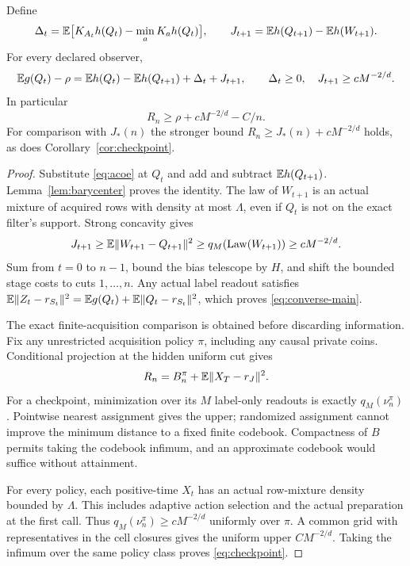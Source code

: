 \begin{proposition}\label{prop:all-observer}
Define
\[
 \Delta_t=\mathbb E\bigl[K_{A_t}h(Q_t)-\min_aK_ah(Q_t)\bigr],\qquad
 J_{t+1}=\mathbb E h(Q_{t+1})-\mathbb E h(W_{t+1}).
\]
For every declared observer,
\begin{equation}\label{eq:bellman-loss}
 \mathbb E g(Q_t)-\rho
  =\mathbb E h(Q_t)-\mathbb E h(Q_{t+1})+\Delta_t+J_{t+1},
 \qquad \Delta_t\ge0,\quad J_{t+1}\ge cM^{-2/d}.
\end{equation}
In particular
\begin{equation}\label{eq:converse-main}
 R_n\ge\rho+cM^{-2/d}-C/n.
\end{equation}
For comparison with $J_*(n)$ the stronger bound $R_n\ge J_*(n)+cM^{-2/d}$ holds, as does Corollary~\ref{cor:checkpoint}.
\end{proposition}
\begin{proof}
Substitute \eqref{eq:acoe} at $Q_t$ and add and subtract $\mathbb E h(Q_{t+1})$. Lemma~\ref{lem:barycenter} proves the identity. The law of $W_{t+1}$ is an actual mixture of acquired rows with density at most $\Lambda$, even if $Q_t$ is not on the exact filter's support. Strong concavity gives
\[
 J_{t+1}\ge\mathbb E\lVert W_{t+1}-Q_{t+1}\rVert^2
            \ge q_M(\operatorname{Law}(W_{t+1}))\ge cM^{-2/d}.
\]
Sum from $t=0$ to $n-1$, bound the bias telescope by $H$, and shift the bounded stage costs to cuts $1,\ldots,n$. Any actual label readout satisfies
$\mathbb E\lVert Z_t-r_{S_t}\rVert^2=\mathbb E g(Q_t)+\mathbb E\lVert Q_t-r_{S_t}\rVert^2$,
which proves \eqref{eq:converse-main}.

The exact finite-acquisition comparison is obtained before discarding information. Fix any unrestricted acquisition policy $\pi$, including any causal private coins. Conditional projection at the hidden uniform cut gives
\[
 R_n=B_n^\pi+\mathbb E\lVert X_T-r_J\rVert^2.
\]
For a checkpoint, minimization over its $M$ label-only readouts is exactly $q_M(\nu_n^\pi)$. Pointwise nearest assignment gives the upper; randomized assignment cannot improve the minimum distance to a fixed finite codebook. Compactness of $B$ permits taking the codebook infimum, and an approximate codebook would suffice without attainment.

For every policy, each positive-time $X_t$ has an actual row-mixture density bounded by $\Lambda$. This includes adaptive action selection and the actual preparation at the first call. Thus $q_M(\nu_n^\pi)\ge cM^{-2/d}$ uniformly over $\pi$. A common grid with representatives in the cell closures gives the uniform upper $CM^{-2/d}$. Taking the infimum over the same policy class proves \eqref{eq:checkpoint}.


\end{proof}
